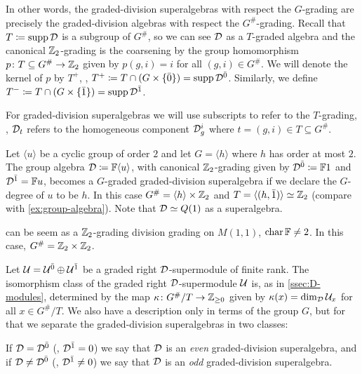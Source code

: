 In other words, the graded-division superalgebras with respect the $G$-grading are precisely the graded-division algebras with respect the $G^\#$-grading. 
Recall that $T \coloneqq \operatorname{supp} \mathcal{D}$ is a subgroup of $G^\#$, so we can see $\mathcal{D}$ as a $T$-graded algebra and the canonical $\mathbb{Z}_2$-grading is the coarsening by the group homomorphism $p\colon T \subseteq G^\# \to \mathbb{Z}_2$ given by $p (g, i) = i$ for all $(g,i)\in G^\#$. 
We will denote the kernel of $p$ by $T^+$, \ie, $T^+ \coloneqq T\cap (G\times \{ \bar 0 \}) = \operatorname{supp} \mathcal{D}^{\bar0}$. 
Similarly, we define $T^- \coloneqq T\cap (G\times \{ \bar 1 \}) =  \operatorname{supp} \mathcal{D}^{\bar1}$. 

\begin{notation}
    For graded-division superalgebras we will use subscripts to refer to the $T$-grading, \ie, $\mathcal{D}_t$ refers to the homogeneous component $\mathcal{D}_g^i$ where $t = (g, i) \in T \subseteq G^\#$. 
\end{notation}

\begin{ex}\label{ex:Q(1)-as-grd-div-SA}
    Let $\langle u \rangle$ be a cyclic group of order $2$ and let $G = \langle h \rangle$ where $h$ has order at most $2$.  
    The group algebra $\mathcal{D} \coloneqq \mathbb{F}\langle u \rangle$, with canonical $\mathbb{Z}_2$-grading given by $\mathcal{D}^{\bar0} \coloneqq \mathbb{F} 1$ and $\mathcal{D}^{\bar1} = \mathbb{F} u$, becomes a $G$-graded graded-division superalgebra if we declare the $G$-degree of $u$ to be $h$. 
    In this case $G^\# = \langle h \rangle \times \mathbb{Z}_2$ and $T = \langle (h, \bar 1) \rangle \simeq \mathbb{Z}_2$ 
    (compare with \cref{ex:group-algebra}). 
    Note that $\mathcal{D} \simeq Q(1)$ as a superalgebra.
\end{ex}

\begin{ex}\label{ex:Pauli-2x2-super}
     can be seem as a $\mathbb{Z}_2$-grading division grading on $M(1,1)$, $\operatorname{char} \mathbb{F} \neq 2$. 
    In this case, $G^\# = \mathbb{Z}_2 \times \mathbb{Z}_2$.
\end{ex}

Let $\mathcal U = \mathcal U^{\bar0} \oplus \mathcal U^{\bar1}$ be a graded right $\mathcal{D}$-supermodule of finite rank. 
The isomorphism class of the graded right $\mathcal{D}$-supermodule $\mathcal U$ is, as in \cref{ssec:D-modules}, determined by the map $\kappa\colon G^\#/T \to \mathbb{Z}_{\geq 0}$ given by $\kappa (x) = \dim_{\mathcal{D}} \mathcal U_x$ for all $x\in G^\#/T$. 
We also have a description only in terms of the group $G$, but for that we separate the graded-division superalgebras in two classes:

\begin{defi}\label{defi:even-odd-D}
    If $\mathcal{D} = \mathcal{D}^{\bar0}$ (\ie, $\mathcal{D}^{\bar1} = 0$) we say that $\mathcal{D}$ is an \emph{even} graded-division superalgebra, and if $\mathcal{D} \neq \mathcal{D}^{\bar0}$ (\ie, $\mathcal{D}^{\bar1} \neq 0$) we say that $\mathcal{D}$ is an \emph{odd} graded-division superalgebra. 
\end{defi}

